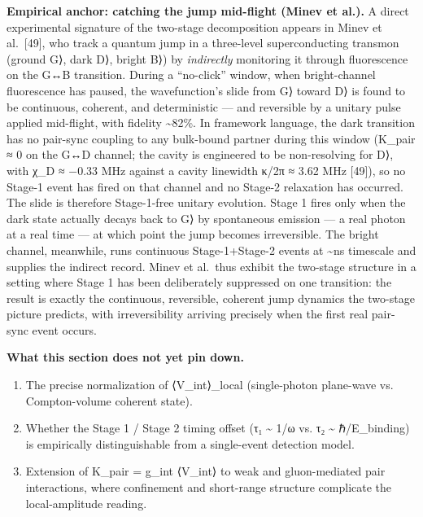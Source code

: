 \documentclass[
]{article}
\providecommand{\tightlist}{%
  \setlength{\itemsep}{0pt}\setlength{\parskip}{0pt}}
\begin{document}
\textbf{Empirical anchor: catching the jump mid-flight (Minev et al.).}
A direct experimental signature of the two-stage decomposition appears
in Minev et al.~{[}49{]}, who track a quantum jump in a three-level
superconducting transmon (ground \textbar G⟩, dark \textbar D⟩, bright
\textbar B⟩) by \emph{indirectly} monitoring it through fluorescence on
the G↔B transition. During a ``no-click'' window, when bright-channel
fluorescence has paused, the wavefunction's slide from \textbar G⟩
toward \textbar D⟩ is found to be continuous, coherent, and
deterministic --- and reversible by a unitary pulse applied mid-flight,
with fidelity \textasciitilde82\%. In framework language, the dark
transition has no pair-sync coupling to any bulk-bound partner during
this window (K\_pair ≈ 0 on the G↔D channel; the cavity is engineered to
be non-resolving for \textbar D⟩, with χ\_D ≈ −0.33 MHz against a cavity
linewidth κ/2π ≈ 3.62 MHz {[}49{]}), so no Stage-1 event has fired on
that channel and no Stage-2 relaxation has occurred. The slide is
therefore Stage-1-free unitary evolution. Stage 1 fires only when the
dark state actually decays back to \textbar G⟩ by spontaneous emission
--- a real photon at a real time --- at which point the jump becomes
irreversible. The bright channel, meanwhile, runs continuous
Stage-1+Stage-2 events at \textasciitilde ns timescale and supplies the
indirect record. Minev et al.~thus exhibit the two-stage structure in a
setting where Stage 1 has been deliberately suppressed on one
transition: the result is exactly the continuous, reversible, coherent
jump dynamics the two-stage picture predicts, with irreversibility
arriving precisely when the first real pair-sync event occurs.

\textbf{What this section does not yet pin down.}

\begin{enumerate}
\def\labelenumi{\arabic{enumi}.}
\tightlist
\item
  The precise normalization of ⟨V\_int⟩\_local (single-photon plane-wave
  vs. Compton-volume coherent state).
\item
  Whether the Stage 1 / Stage 2 timing offset (τ₁ \textasciitilde{} 1/ω
  vs. τ₂ \textasciitilde{} ℏ/E\_binding) is empirically distinguishable
  from a single-event detection model.
\item
  Extension of K\_pair = g\_int ⟨V\_int⟩ to weak and gluon-mediated pair
  interactions, where confinement and short-range structure complicate
  the local-amplitude reading.
\end{enumerate}
\end{document}
